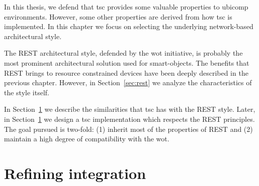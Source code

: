 In this thesis, we defend that \acf{tsc} provides some valuable properties to \ac{ubicomp} environments. %
However, some other properties are derived from how \ac{tsc} is implemented.
In this chapter we focus on selecting the underlying network-based architectural style.


The REST architectural style, defended by the \acf{wot} initiative, is probably the most prominent architectural solution used for smart-objects. %
The benefits that REST brings to resource constrained devices have been deeply described in the previous chapter.
However, in Section~\ref{sec:rest} we analyze the characteristics of the style itself.

In Section~\ref{} we describe the similarities that \ac{tsc} has with the REST style.
Later, in Section~\ref{} we design a \ac{tsc} implementation which respects the REST principles.
The goal pursued is two-fold: (1) inherit most of the properties of REST and (2) maintain a high degree of compatibility with the \ac{wot}.










\section{Refining integration} %


